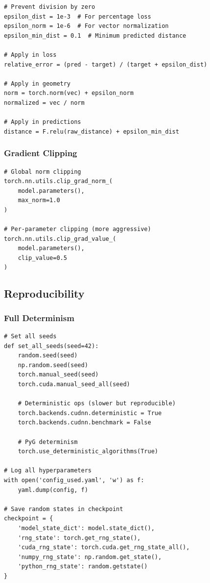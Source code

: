 \documentclass[11pt,a4paper]{article}
\begin{document}
\begin{lstlisting}
# Prevent division by zero
epsilon_dist = 1e-3  # For percentage loss
epsilon_norm = 1e-6  # For vector normalization
epsilon_min_dist = 0.1  # Minimum predicted distance

# Apply in loss
relative_error = (pred - target) / (target + epsilon_dist)

# Apply in geometry
norm = torch.norm(vec) + epsilon_norm
normalized = vec / norm

# Apply in predictions
distance = F.relu(raw_distance) + epsilon_min_dist
\end{lstlisting}

\subsubsection{Gradient Clipping}

\begin{lstlisting}
# Global norm clipping
torch.nn.utils.clip_grad_norm_(
    model.parameters(),
    max_norm=1.0
)

# Per-parameter clipping (more aggressive)
torch.nn.utils.clip_grad_value_(
    model.parameters(),
    clip_value=0.5
)
\end{lstlisting}

\subsection{Reproducibility}

\subsubsection{Full Determinism}

\begin{lstlisting}
# Set all seeds
def set_all_seeds(seed=42):
    random.seed(seed)
    np.random.seed(seed)
    torch.manual_seed(seed)
    torch.cuda.manual_seed_all(seed)

    # Deterministic ops (slower but reproducible)
    torch.backends.cudnn.deterministic = True
    torch.backends.cudnn.benchmark = False

    # PyG determinism
    torch.use_deterministic_algorithms(True)

# Log all hyperparameters
with open('config_used.yaml', 'w') as f:
    yaml.dump(config, f)

# Save random states in checkpoint
checkpoint = {
    'model_state_dict': model.state_dict(),
    'rng_state': torch.get_rng_state(),
    'cuda_rng_state': torch.cuda.get_rng_state_all(),
    'numpy_rng_state': np.random.get_state(),
    'python_rng_state': random.getstate()
}
\end{lstlisting}
\end{document}
